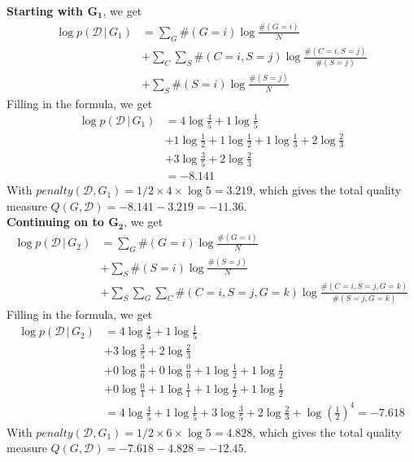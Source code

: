 \documentclass{article}
\newcommand{\giv}{\,|\,}
\begin{document}
\noindent \textbf{Starting with $\mathbf{G_1}$}, we get
\begin{align*}
    \log p(\mathcal{D} \giv G_1) &= \sum_G \#(G = i) \log \frac{\#(G = i)}{N} \\
    &+ \sum_C\sum_S \#(C = i, S = j) \log \frac{\#(C = i, S = j)}{\#(S = j)} \\
    &+ \sum_S \#(S = i) \log \frac{\#(S = j)}{N}
\end{align*}
\noindent Filling in the formula, we get
\begin{align*}
    \log p(\mathcal{D} \giv G_1) &= 4 \log \frac{4}{5} + 1 \log \frac{1}{5} \\
    &+ 1 \log \frac{1}{2} + 1 \log \frac{1}{2} + 1 \log \frac{1}{3} + 2 \log \frac{2}{3} \\
    &+ 3 \log \frac{3}{5} + 2 \log \frac23\\
    &= -8.141
\end{align*}
\noindent With $penalty(\mathcal{D}, G_1) = 1/2 \times 4 \times \log 5 = 3.219$, which gives the total quality measure $Q(G, \mathcal{D}) = -8.141 - 3.219 = -11.36$. 
\\
\noindent \textbf{Continuing on to $\mathbf{G_2}$}, we get
\begin{align*}
    \log p(\mathcal{D} \giv G_2) &= \sum_G \#(G = i) \log \frac{\#(G = i)}{N} \\
    &+ \sum_S \#(S = i) \log \frac{\#(S = j)}{N}\\
    &+ \sum_S\sum_G\sum_C \#(C = i, S = j, G = k) \log \frac{\#(C = i, S = j, G = k)}{\#(S = j, G = k)}
\end{align*}
\noindent Filling in the formula, we get
\begin{align*}
    \log p(\mathcal{D} \giv G_2) &= 4 \log \frac{4}{5} + 1 \log \frac{1}{5} \\
    &+ 3 \log \frac{3}{5} + 2 \log \frac23\\
    &+ 0 \log \frac{0}{0} + 0 \log \frac{0}{0} + 1 \log \frac{1}{2} + 1 \log \frac{1}{2} \\
    &+ 0 \log \frac{0}{1} + 1 \log \frac{1}{1} + 1 \log \frac{1}{2} + 1 \log \frac{1}{2} \\
    &= 4 \log \frac{4}{5} + 1 \log \frac{1}{5} + 3 \log \frac{3}{5} + 2 \log \frac23 + \log(\frac12)^4 = -7.618
\end{align*}
\noindent With $penalty(\mathcal{D}, G_1) = 1/2 \times 6 \times \log 5 = 4.828$, which gives the total quality measure $Q(G, \mathcal{D}) = -7.618 - 4.828 = -12.45$. 
\end{document}
